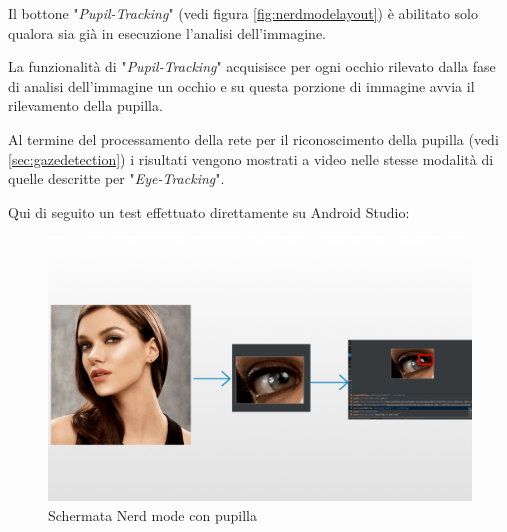 Il bottone "\textit{Pupil-Tracking}" (vedi figura \ref{fig:nerdmodelayout}) è abilitato solo qualora sia già in esecuzione l'analisi dell'immagine.

La funzionalità di "\textit{Pupil-Tracking}" acquisisce per ogni occhio rilevato dalla fase di analisi dell'immagine un occhio e su questa porzione di immagine avvia il rilevamento della pupilla.

Al termine del processamento della rete per il riconoscimento della pupilla (vedi \ref{sec:gazedetection}) i risultati vengono mostrati a video nelle stesse modalità di quelle descritte per "\textit{Eye-Tracking}".

Qui di seguito un test effettuato direttamente su Android Studio:

\begin{figure}[htbp]
    \centering
    \includegraphics[scale=0.24]{ProgettoAndroid/NerdMode/RiconoscimentoPupilla/Images/gazeAndroid.png}
    \caption{Schermata Nerd mode con pupilla}
    \label{fig:nerdmodepupil}
\end{figure}